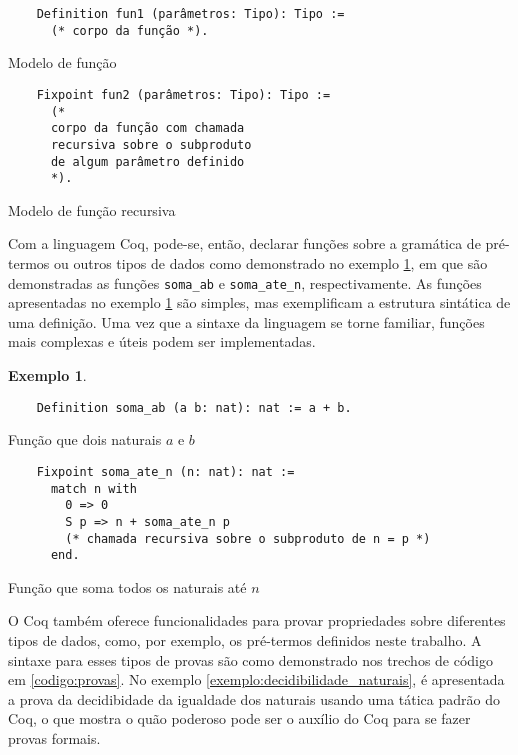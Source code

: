 \documentclass{article}
\newenvironment{codigo}{\captionsetup{type=listing}}{}
\newtheorem{exemplo}{Exemplo}
\begin{document}
\begin{codigo}
\begin{verbatim}
	Definition fun1 (parâmetros: Tipo): Tipo :=
	  (* corpo da função *).
\end{verbatim}
\caption{Modelo de função}
\label{codigo:funcao}
\end{codigo}

\begin{codigo}
\begin{verbatim}
	Fixpoint fun2 (parâmetros: Tipo): Tipo :=
	  (*
	  corpo da função com chamada
	  recursiva sobre o subproduto
	  de algum parâmetro definido
	  *).
\end{verbatim}
\caption{Modelo de função recursiva}
\label{codigo:funcao_recursiva}
\end{codigo}

Com a linguagem Coq, pode-se, então, declarar funções sobre a gramática de pré-termos ou outros tipos de dados como demonstrado no exemplo \ref{exemplo:funcoes_pre-termos}, em que são demonstradas as funções \texttt{soma\_ab} e \texttt{soma\_ate\_n}, respectivamente. As funções apresentadas no exemplo \ref{exemplo:funcoes_pre-termos} são simples, mas exemplificam a estrutura sintática de uma definição.  Uma vez que a sintaxe da linguagem se torne familiar, funções mais complexas e úteis podem ser implementadas.

\begin{exemplo}
	\label{exemplo:funcoes_pre-termos}
\end{exemplo}
\begin{codigo}
\begin{verbatim}
	Definition soma_ab (a b: nat): nat := a + b.
\end{verbatim}
\caption{Função que dois naturais $a$ e $b$}
\label{codigo:soma_ab}
\end{codigo}

\begin{codigo}
\begin{verbatim}
	Fixpoint soma_ate_n (n: nat): nat :=
	  match n with
		0 => 0
		S p => n + soma_ate_n p
		(* chamada recursiva sobre o subproduto de n = p *)
	  end.
\end{verbatim}
\caption{Função que soma todos os naturais até $n$}
\label{codigo:soma_ate_n}
\end{codigo}

O Coq também oferece funcionalidades para provar propriedades sobre diferentes tipos de dados, como, por exemplo, os pré-termos definidos neste trabalho. A sintaxe para esses tipos de provas são como demonstrado nos trechos de código em \ref{codigo:provas}. No exemplo \ref{exemplo:decidibilidade_naturais}, é apresentada a prova da decidibidade da igualdade dos naturais usando uma tática padrão do Coq, o que mostra o quão poderoso pode ser o auxílio do Coq para se fazer provas formais.
\end{document}
